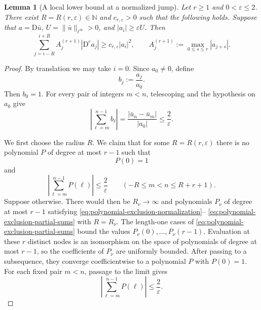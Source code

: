 \documentclass[11pt]{amsart}
\theoremstyle{plain}
\newtheorem{lemma}[theorem]{Lemma}
\theoremstyle{definition}
\theoremstyle{remark}
\numberwithin{equation}{section}
\theoremstyle{plain}
\begin{document}
\begin{lemma}[A local lower bound at a normalized jump]
	\label{lem:large-jump-local}
	Let $r\ge1$ and $0<\varepsilon\le2$.  There exist
	$R=R(r,\varepsilon)\in\mathbb N$ and $c_{r,\varepsilon}>0$ such that the
	following holds.  Suppose that $a=\mathrm D\bar u$,
	$U=\|\bar u\|_{\ell^\infty}>0$, and
	$|a_i|\ge\varepsilon U$.  Then
	\begin{equation}\label{eq:large-jump-local}
		\sum_{j=i-R}^{i+R}
		A_j^{(r+1)}|\mathrm D^ra_j|
		\ge c_{r,\varepsilon}|a_i|^2,
		\qquad
		A_j^{(r+1)}:=\max_{0\le s\le r}|a_{j+s}|.
	\end{equation}
\end{lemma}

\begin{proof}
	By translation we may take $i=0$.  Since $a_0\ne0$, define
	\begin{equation}\label{eq:large-jump-normalization}
		b_j:=\frac{a_j}{a_0}.
	\end{equation}
	Then $b_0=1$.  For every pair of integers $m<n$, telescoping and the
	hypothesis on $a_0$ give
	\begin{equation}\label{eq:normalized-partial-sums}
		\left|\sum_{\ell=m}^{n-1}b_\ell\right|
		=\frac{|\bar u_n-\bar u_m|}{|a_0|}
		\le\frac{2}{\varepsilon}.
	\end{equation}
	
	We first choose the radius $R$.  We claim that for some
	$R=R(r,\varepsilon)$ there is no polynomial $P$ of degree at most $r-1$
	such that
	\begin{equation}\label{eq:polynomial-exclusion-normalization}
		P(0)=1
	\end{equation}
	and
	\begin{equation}\label{eq:polynomial-exclusion-partial-sums}
		\left|\sum_{\ell=m}^{n-1}P(\ell)\right|
		\le\frac{2}{\varepsilon}
		\qquad
		(-R\le m<n\le R+r+1).
	\end{equation}
	Suppose otherwise.  There would then be $R_\nu\to\infty$ and polynomials
	$P_\nu$ of degree at most $r-1$ satisfying
	\eqref{eq:polynomial-exclusion-normalization}--
	\eqref{eq:polynomial-exclusion-partial-sums} with $R=R_\nu$.
	The length-one cases of
	\eqref{eq:polynomial-exclusion-partial-sums} bound the values
	$P_\nu(0),\ldots,P_\nu(r-1)$.  Evaluation at these $r$ distinct nodes is an
	isomorphism on the space of polynomials of degree at most $r-1$, so the
	coefficients of $P_\nu$ are uniformly bounded.  After passing to a
	subsequence, they converge coefficientwise to a polynomial $P$ with
	$P(0)=1$.  For each fixed pair $m<n$, passage to the limit gives
	\begin{equation}\label{eq:limiting-polynomial-partial-sums}
		\left|\sum_{\ell=m}^{n-1}P(\ell)\right|
		\le\frac{2}{\varepsilon}.
	\end{equation}
	

\end{proof}
\end{document}
